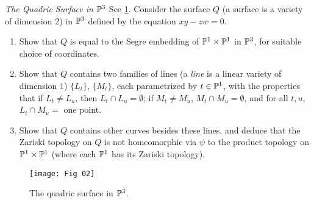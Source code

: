 \label{1.2.15}

\textit{The Quadric Surface in $\P^3$} See \ref{fig1.2.4}. Consider the surface $Q$ (a surface is a variety of dimension $2$) in $\P^3$ defined by the equation $xy - zw = 0$.

\begin{enumerate}[label = (\alph*)]
    \item Show that $Q$ is equal to the Segre embedding of $\P^1 \times \P^1$ in $\P^3$, for suitable choice of coordinates.
    
    \item Show that $Q$ contains two families of lines (a \textit{line} is a linear variety of dimension $1$) $\{L_t\}$, $\{M_t\}$, each parametrized by $t \in \P^1$, with the properties that if $L_t \neq L_u$, then $L_t \cap L_u = \emptyset$; if $M_t \neq M_u$, $M_t \cap M_u = \emptyset$, and for all $t, u$, $L_t \cap M_u = $ one point.
    
    \item Show that $Q$ contains other curves besides these lines, and deduce that the Zariski topology on $Q$ is not homeomorphic via $\psi$ to the product topology on $\P^1 \times \P^1$ (where each $\P^1$ has its Zariski topology).
\end{enumerate}

\begin{figure}[h]
    \centering
    \texttt{[image: Fig 02]}
    \caption{The quadric surface in $\P^3$.}
    \label{fig1.2.4}
\end{figure}

